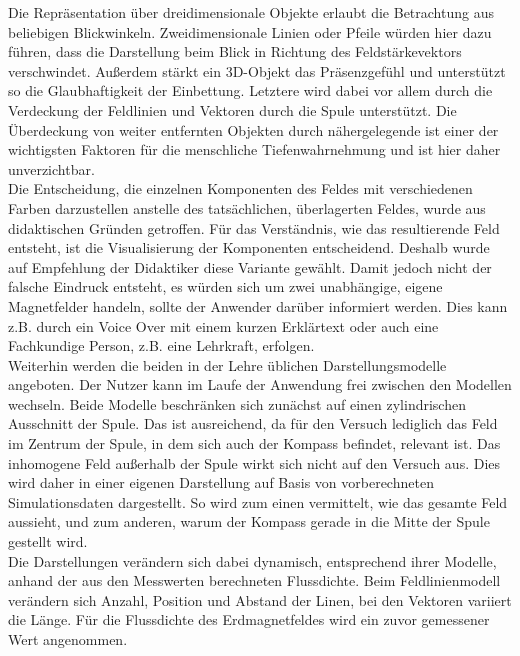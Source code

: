 Die Repräsentation über dreidimensionale Objekte erlaubt die Betrachtung aus beliebigen Blickwinkeln. Zweidimensionale Linien oder Pfeile würden hier dazu führen, dass die Darstellung beim Blick in Richtung des Feldstärkevektors verschwindet. Außerdem stärkt ein 3D-Objekt das Präsenzgefühl und unterstützt so die Glaubhaftigkeit der Einbettung. Letztere wird dabei vor allem durch die Verdeckung der Feldlinien und Vektoren durch die Spule unterstützt. Die Überdeckung von weiter entfernten Objekten durch nähergelegende ist einer der wichtigsten Faktoren für die menschliche Tiefenwahrnehmung und ist hier daher unverzichtbar.\\

Die Entscheidung, die einzelnen Komponenten des Feldes mit verschiedenen Farben darzustellen anstelle des tatsächlichen, überlagerten Feldes, wurde aus didaktischen Gründen getroffen. Für das Verständnis, wie das resultierende Feld entsteht, ist die Visualisierung der Komponenten entscheidend. Deshalb wurde auf Empfehlung der Didaktiker diese Variante gewählt. Damit jedoch nicht der falsche Eindruck entsteht, es würden sich um zwei unabhängige, eigene Magnetfelder handeln, sollte der Anwender darüber informiert werden. Dies kann z.B. durch ein Voice Over mit einem kurzen Erklärtext oder auch eine Fachkundige Person, z.B. eine Lehrkraft, erfolgen.\\

Weiterhin werden die beiden in der Lehre üblichen Darstellungsmodelle angeboten. Der Nutzer kann im Laufe der Anwendung frei zwischen den Modellen wechseln. Beide Modelle beschränken sich zunächst auf einen zylindrischen Ausschnitt der Spule. Das ist ausreichend, da für den Versuch lediglich das Feld im Zentrum der Spule, in dem sich auch der Kompass befindet, relevant ist. Das inhomogene Feld außerhalb der Spule wirkt sich nicht auf den Versuch aus. Dies wird daher in einer eigenen Darstellung auf Basis von vorberechneten Simulationsdaten dargestellt. So wird zum einen vermittelt, wie das gesamte Feld aussieht, und zum anderen, warum der Kompass gerade in die Mitte der Spule gestellt wird.\\

Die Darstellungen verändern sich dabei dynamisch, entsprechend ihrer Modelle, anhand der aus den Messwerten berechneten Flussdichte. Beim Feldlinienmodell verändern sich Anzahl, Position und Abstand der Linen, bei den Vektoren variiert die Länge. Für die Flussdichte des Erdmagnetfeldes wird ein zuvor gemessener Wert angenommen.\\


